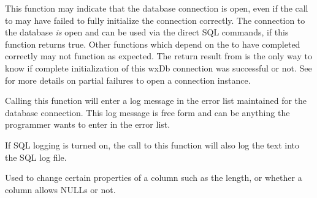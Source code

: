 This function may indicate that the database connection is open, even if
the call to  may have failed to fully
initialize the connection correctly.  The connection to the database
{\it is} open and can be used via the direct SQL commands, if this
function returns true.  Other functions which depend on the
 to have completed correctly may not function
as expected.  The return result from  is the
only way to know if complete initialization of this wxDb connection was
successful or not.  See  for more details on
partial failures to open a connection instance.

\label{wxdblogerror}




Calling this function will enter a log message in the error list maintained
for the database connection.  This log message is free form and can be
anything the programmer wants to enter in the error list.

If SQL logging is turned on, the call to this function will also log the
text into the SQL log file.



\label{wxdbmodifycolumn}


Used to change certain properties of a column such as the length, or whether a column
allows NULLs or not.


